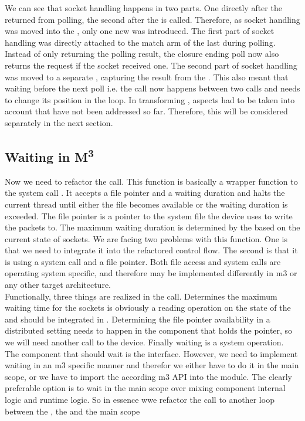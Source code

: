 We can see that socket handling happens in two parts. One directly after the \stack{} returned from polling, the second after the \store{} is called. Therefore, as socket handling was moved into the \stack{}, only one new  was introduced. The first part of socket handling was directly attached to the match arm of the last  during polling. Instead of only returning the polling result, the closure ending poll now also returns the request if the socket received one. The second part of socket handling was moved to a separate , capturing the result from the \store{}. This also meant that waiting before the next poll i.e. the  call now happens between two \stack{} calls and needs to change its position in the loop. In transforming , aspects had to be taken into account that have not been addressed so far. Therefore, this will be considered separately in the next section.

\subsection{Waiting in M\textsuperscript{3}}

Now we need to refactor the  call. This function is basically a wrapper function to the system call . It accepts a file pointer and a waiting  duration and halts the current thread until either the file becomes available or the waiting duration is exceeded. The file pointer is a pointer to the system file the device uses to write the packets to. The maximum waiting duration is determined by the  based on the current state of sockets. We are facing two problems with this function. One is that we need to integrate it into the refactored control flow. The second is that it is using a system call and a file pointer. Both file access and system calls are operating system specific, and therefore may be implemented differently in m3 or any other target architecture. \\

Functionally, three things are realized in the  call. Determines the maximum waiting time for the sockets is obviously a reading operation on the state of the \stack{} and should be integrated in . Determining the file pointer availability in a distributed setting needs to happen in the component that holds the pointer, so we will need another call to the device. Finally waiting is a system operation. The component that should wait is the interface. However, we need to implement waiting in an m3 specific manner and therefor we either have to do it in the main scope, or we have to import the according m3 API into the  module. The clearly preferable option is to wait in the main scope over mixing component internal logic and runtime logic. So in essence wwe refactor the  call to another loop between the \stack{}, the \dev{} and the main scope\\

